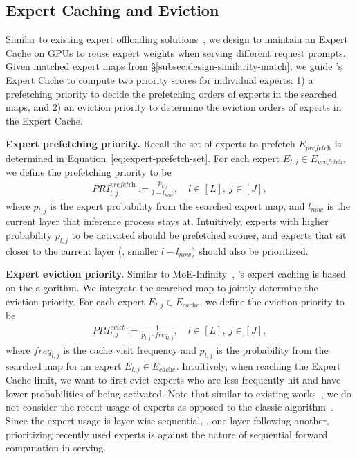 \subsection{Expert Caching and Eviction}
\label{subsec:design-expert-cache}


Similar to existing expert offloading solutions~\cite{eliseev2023fast,xue2024moe,song2024promoe}, we design \sys to maintain an Expert Cache on GPUs to reuse expert weights when serving different request prompts.
Given matched expert maps from \S\ref{subsec:design-similarity-match}, we guide \sys's Expert Cache to compute two priority scores for individual experts: 
1) a prefetching priority to decide the prefetching orders of experts in the searched maps, and 
2) an eviction priority to determine the eviction orders of experts in the Expert Cache. 


\textbf{Expert prefetching priority.}
Recall the set of experts to prefetch $E_{\textit{prefetch}}$ is determined in Equation~\ref{eq:expert-prefetch-set}. For each expert $E_{l,j} \in E_{\textit{prefetch}}$, we define the prefetching priority to be
\begin{align*}
    PRI^{\textit{prefetch}}_{l, j} := \frac{p_{l,j}}{l-l_{\textit{now}}}, \quad l \in [L], ~j \in [J],
\end{align*}
where $p_{l,j}$ is the expert probability from the searched expert map, and $l_{\textit{now}}$ is the current layer that inference process stays at.
Intuitively, experts with higher probability $p_{l,j}$ to be activated should be prefetched sooner, and experts that sit closer to the current layer (\ie, smaller $l - l_{\textit{now}}$) should also be prioritized.

\textbf{Expert eviction priority.}
Similar to MoE-Infinity~\cite{xue2024moe}, \sys's expert caching is based on the \LFU algorithm. We integrate the searched map to jointly determine the eviction priority.
For each expert $E_{l,j} \in E_{\textit{cache}}$, we define the eviction priority to be
\begin{align*}
    \textit{PRI}^{\textit{evict}}_{l, j} := \frac{1}{p_{l,j} \cdot \textit{freq}_{l,j}}, \quad l \in [L], ~j \in [J],
\end{align*}
where $\textit{freq}_{l,j}$ is the cache visit frequency and $p_{l,j}$ is the probability from the searched map for an expert $E_{l,j} \in E_{\textit{cache}}$. 
%
Intuitively, when reaching the Expert Cache limit, we want to first evict experts who are less frequently hit and have lower probabilities of being activated.
Note that similar to existing works~\cite{xue2024moe,song2024promoe}, we do not consider the recent usage of experts as opposed to the classic \LRU algorithm~\cite{eliseev2023fast}.
Since the expert usage is layer-wise sequential, \ie, one layer following another, prioritizing recently used experts is against the nature of sequential forward computation in \MoE serving.


